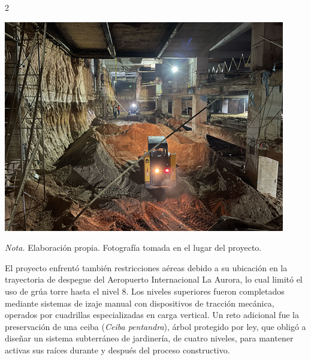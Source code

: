 \documentclass[12pt,spanish,Letterpaper,openany]{book}
\begin{document}
\begin {multicols}{2}
\begin {flushleft}
\noindent\begin{minipage}[c]{\columnwidth}

\textbf{}

\begin{center}\includegraphics[width=0.65\linewidth]{imagenes_articulos/art02_01} \end{center}

\emph{Nota. }Elaboración propia. Fotografía tomada en el lugar del proyecto.

\end{minipage}
\end {flushleft}

El proyecto enfrentó también restricciones aéreas debido a su ubicación en la trayectoria de despegue del Aeropuerto Internacional La Aurora, lo cual limitó el uso de grúa torre hasta el nivel 8. Los niveles superiores fueron completados mediante sistemas de izaje manual con dispositivos de tracción mecánica, operados por cuadrillas especializadas en carga vertical. Un reto adicional fue la preservación de una ceiba (\emph{Ceiba pentandra}), árbol protegido por ley, que obligó a diseñar un sistema subterráneo de jardinería, de cuatro niveles, para mantener activas sus raíces durante y después del proceso constructivo.

\begin {flushleft}
\noindent\begin{minipage}[c]{\columnwidth}

\textbf{}


\end{minipage}
\end{flushleft}
\end{multicols}
\end{document}
